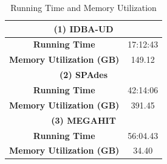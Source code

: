 \documentclass[10pt,a4paper,twocolumn]{article}
\begin{document}
 \begin{table}[h]
\caption{Running Time and Memory Utilization}
\centering
\begin{tabular}{|c|c|}
\hline
\multicolumn{2}{|c|}{ \textbf{(1) IDBA-UD}}    \\ [0.5ex] %
\hline
\textbf{Running Time}&17:12:43 \\ 
\hline
\textbf{Memory Utilization (GB)}&149.12\\ 
\hline
\multicolumn{2}{|c|}{ \textbf{(2) SPAdes} }   \\ [0.5ex] %
\hline
\textbf{Running Time} & 42:14:06   \\
\hline
\textbf{Memory Utilization (GB)}& 391.45   \\ 
\hline
\multicolumn{2}{|c|}{ \textbf{(3) MEGAHIT} }    \\ [0.5ex] %
\hline
\textbf{Running Time}& 56:04.43 \\
\hline
\textbf{Memory Utilization (GB)}& 34.40 \\ 
\hline

\end{tabular}
\label{table:time-memory}
\end{table}
\end{document}
